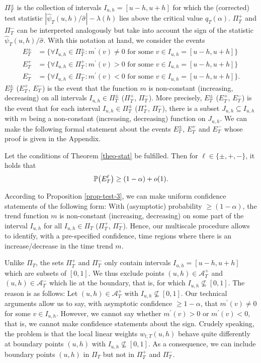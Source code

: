 $\Pi_T^\pm$ is the collection of intervals $I_{u,h} = [u-h,u+h]$ for which the (corrected) test statistic $|\widehat{\psi}_T(u,h)/\widehat{\sigma}| - \lambda(h)$ lies above the critical value $q_T(\alpha)$. $\Pi_T^+$ and $\Pi_T^-$ can be interpreted analogously but take into account the sign of the statistic $\widehat{\psi}_T(u,h)/\widehat{\sigma}$. With this notation at hand, we consider the events 
\begin{align*}
E_T^\pm & = \Big\{ \forall I_{u,h} \in \Pi_T^\pm: m^\prime(v) \ne 0 \text{ for some } v \in I_{u,h} = [u-h,u+h] \Big\} \\
E_T^+  & = \Big\{ \forall I_{u,h} \in \Pi_T^+: m^\prime(v) > 0 \text{ for some } v \in I_{u,h} = [u-h,u+h] \Big\} \\
E_T^-  & = \Big\{ \forall I_{u,h} \in \Pi_T^-: m^\prime(v) < 0 \text{ for some } v \in I_{u,h} = [u-h,u+h] \Big\}.
\end{align*}
$E_T^\pm$ ($E_T^+$, $E_T^-$) is the event that the function $m$ is non-constant (increasing, decreasing) on all intervals $I_{u,h} \in \Pi_T^\pm$ ($\Pi_T^+$, $\Pi_T^-$). More precisely, $E_T^\pm$ ($E_T^+$, $E_T^-$) is the event that for each interval $I_{u,h} \in \Pi_T^\pm$ ($\Pi_T^+$, $\Pi_T^-$), there is a subset $J_{u,h} \subseteq I_{u,h}$ with $m$ being a non-constant (increasing, decreasing) function on $J_{u,h}$. We can make the following formal statement about the events $E_T^\pm$, $E_T^+$ and $E_T^-$ whose proof is given in the Appendix. 
\begin{prop}\label{prop-test-3}
Let the conditions of Theorem \ref{theo-stat} be fulfilled. Then for $\ell \in \{ \pm,+,-\}$, it holds that
\[ \mathbb{P} \big( E_T^\ell \big) \ge (1-\alpha) + o(1). \]
\end{prop}
According to Proposition \ref{prop-test-3}, we can make uniform confidence statements of the following form: With (asymptotic) probability $\ge (1-\alpha)$, the trend function $m$ is non-constant (increasing, decreasing) on some part of the interval $I_{u,h}$ for all $I_{u,h} \in \Pi_T$ ($\Pi_T^+$, $\Pi_T^-$). Hence, our multiscale procedure allows to identify, with a pre-specified confidence, time regions where there is an increase/decrease in the time trend $m$. 


\begin{remark}
Unlike $\Pi_T$, the sets $\Pi_T^+$ and $\Pi_T^-$ only contain intervals $I_{u,h} = [u-h,u+h]$ which are subsets of $[0,1]$. We thus exclude points $(u,h) \in \mathcal{A}_T^+$ and $(u,h) \in \mathcal{A}_T^-$ which lie at the boundary, that is, for which $I_{u,h} \nsubseteq [0,1]$. The reason is as follows: Let $(u,h) \in \mathcal{A}_T^+$ with $I_{u,h} \nsubseteq [0,1]$. Our technical arguments allow us to say, with asymptotic confidence $\ge 1 - \alpha$, that $m^\prime(v) \ne 0$ for some $v \in I_{u,h}$. However, we cannot say whether $m^\prime(v) > 0$ or $m^\prime(v) < 0$, that is, we cannot make confidence statements about the sign. Crudely speaking, the problem is that the local linear weights $w_{t,T}(u,h)$ behave quite differently at boundary points $(u,h)$ with $I_{u,h} \nsubseteq [0,1]$. As a consequence, we can include boundary points $(u,h)$ in $\Pi_T$ but not in $\Pi_T^+$ and $\Pi_T^-$.
\end{remark}
 

